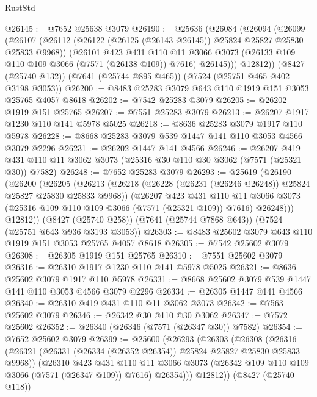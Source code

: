 \begin{lexlean}{RustStd}
\begin{coremodule}
@26145 := @7652 @25638 @3079
@26190 := @25636
    (@26084
      (@26094
        (@26099
          (@26107
            (@26112 (@26122 (@26125 (@26143 @26145)) @25824 @25827 @25830 @25833 @9968))
            (@26101
              @423
              @431
              @110
              @11
              @3066
              @3073
              (@26133 @109 @110 @109 @3066 (@7571 (@26138 @109)) @7616)
              @26145)))
        @12812))
    (@8427 (@25740 @132))
    (@7641 (@25744 @895 @465))
    (@7524 (@25751 @465 @402 @3198 @3053))
@26200 := @8483 @25283 @3079 @643 @110 @1919 @151 @3053 @25765 @4057 @8618
@26202 := @7542 @25283 @3079
@26205 := @26202 @1919 @151 @25765
@26207 := @7551 @25283 @3079
@26213 := @26207 @1917 @1230 @110 @141 @5978 @5025
@26218 := @8636 @25283 @3079 @1917 @110 @5978
@26228 := @8668 @25283 @3079 @539 @1447 @141 @110 @3053 @4566 @3079 @2296
@26231 := @26202 @1447 @141 @4566
@26246 := @26207
    @419
    @431
    @110
    @11
    @3062
    @3073
    (@25316 @30 @110 @30 @3062 (@7571 (@25321 @30)) @7582)
@26248 := @7652 @25283 @3079
@26293 := @25619
    (@26190
      (@26200
        (@26205
          (@26213
            (@26218 (@26228 (@26231 (@26246 @26248)) @25824 @25827 @25830 @25833 @9968))
            (@26207
              @423
              @431
              @110
              @11
              @3066
              @3073
              (@25316 @109 @110 @109 @3066 (@7571 (@25321 @109)) @7616)
              @26248)))
        @12812))
    (@8427 (@25740 @258))
    (@7641 (@25744 @7868 @643))
    (@7524 (@25751 @643 @936 @3193 @3053))
@26303 := @8483 @25602 @3079 @643 @110 @1919 @151 @3053 @25765 @4057 @8618
@26305 := @7542 @25602 @3079
@26308 := @26305 @1919 @151 @25765
@26310 := @7551 @25602 @3079
@26316 := @26310 @1917 @1230 @110 @141 @5978 @5025
@26321 := @8636 @25602 @3079 @1917 @110 @5978
@26331 := @8668 @25602 @3079 @539 @1447 @141 @110 @3053 @4566 @3079 @2296
@26334 := @26305 @1447 @141 @4566
@26340 := @26310 @419 @431 @110 @11 @3062 @3073
@26342 := @7563 @25602 @3079
@26346 := @26342 @30 @110 @30 @3062
@26347 := @7572 @25602
@26352 := @26340 (@26346 (@7571 (@26347 @30)) @7582)
@26354 := @7652 @25602 @3079
@26399 := @25600
    (@26293
      (@26303
        (@26308
          (@26316
            (@26321 (@26331 (@26334 (@26352 @26354)) @25824 @25827 @25830 @25833 @9968))
            (@26310
              @423
              @431
              @110
              @11
              @3066
              @3073
              (@26342 @109 @110 @109 @3066 (@7571 (@26347 @109)) @7616)
              @26354)))
        @12812))
    (@8427 (@25740 @118))

\end{coremodule}
\end{lexlean}

